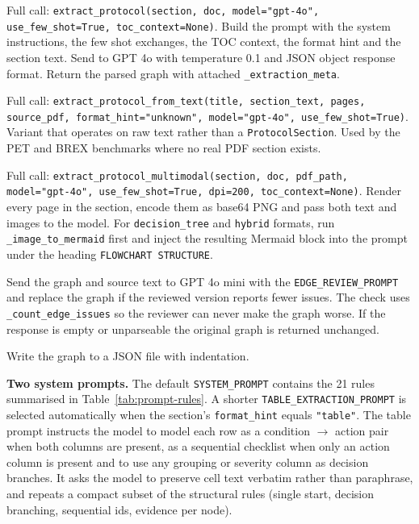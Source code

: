 \documentclass{article}
\begin{document}
\begin{description}[leftmargin=2em, style=nextline]
\item[\texttt{extract\_protocol}]
Full call:
\texttt{extract\_protocol(section,\allowbreak{} doc,\allowbreak{}
model="gpt-4o",\allowbreak{} use\_few\_shot=True,\allowbreak{}
toc\_context=None)}.
Build the prompt with the system instructions, the few shot
exchanges, the TOC context, the format hint and the section text.
Send to GPT 4o with temperature 0.1 and JSON object response format.
Return the parsed graph with attached
\texttt{\_extraction\_meta}.
\item[\texttt{extract\_protocol\_from\_text}]
Full call:
\texttt{extract\_protocol\_from\_text(title,\allowbreak{}
section\_text,\allowbreak{} pages,\allowbreak{} source\_pdf,\allowbreak{}
format\_hint="unknown",\allowbreak{} model="gpt-4o",\allowbreak{}
use\_few\_shot=True)}.
Variant that operates on raw text rather than a
\texttt{ProtocolSection}. Used by the PET and BREX benchmarks where
no real PDF section exists.
\item[\texttt{extract\_protocol\_multimodal}]
Full call:
\texttt{extract\_protocol\_multimodal(section,\allowbreak{}
doc,\allowbreak{} pdf\_path,\allowbreak{} model="gpt-4o",\allowbreak{}
use\_few\_shot=True,\allowbreak{} dpi=200,\allowbreak{}
toc\_context=None)}.
Render every page in the section, encode them as base64 PNG and pass
both text and images to the model. For \texttt{decision\_tree} and
\texttt{hybrid} formats, run \texttt{\_image\_to\_mermaid} first and
inject the resulting Mermaid block into the prompt under the heading
\texttt{FLOWCHART STRUCTURE}.
\item[\texttt{review\_edges(extracted,\allowbreak{} source\_text,\allowbreak{} model="gpt-4o-mini")}]
Send the graph and source text to GPT 4o mini with the
\texttt{EDGE\_REVIEW\_PROMPT} and replace the graph if the reviewed
version reports fewer issues. The check uses
\texttt{\_count\_edge\_issues} so the reviewer can never make the
graph worse. If the response is empty or unparseable the original
graph is returned unchanged.
\item[\texttt{save\_extraction(graph, path)}]
Write the graph to a JSON file with indentation.
\end{description}

\textbf{Two system prompts.} The default \texttt{SYSTEM\_PROMPT}
contains the 21 rules summarised in Table~\ref{tab:prompt-rules}. A
shorter \texttt{TABLE\_EXTRACTION\_PROMPT} is selected automatically
when the section's \texttt{format\_hint} equals \texttt{"table"}.
The table prompt instructs the model to model each row as a
condition $\rightarrow$ action pair when both columns are present,
as a sequential checklist when only an action column is present and
to use any grouping or severity column as decision branches. It
asks the model to preserve cell text verbatim rather than
paraphrase, and repeats a compact subset of the structural rules
(single start, decision branching, sequential ids, evidence per
node).
\end{document}

